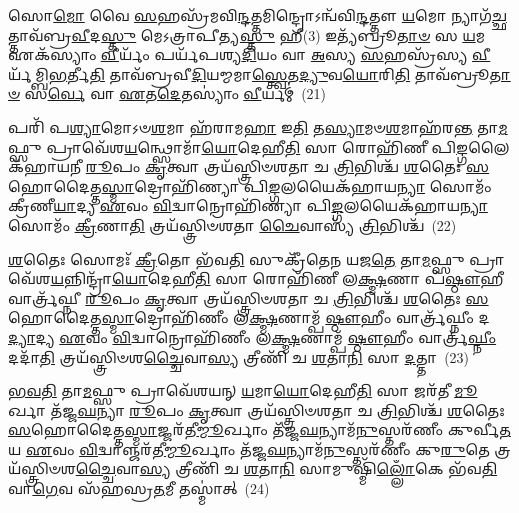 {\anuvakamend[{\-\ul{𑌅}\-\-\ul{𑌬𑍍𑌰}\-\-\ul{𑌵𑍀}\-\-\ul{𑌚𑍍𑌚} 𑌤\-\ul{𑌦}\-𑌨𑍍𑌤𑌰𑌿᳴𑌕𑍍𑌷𑌨𑍍𑌦𑌦𑌾𑌤𑍍𑌯𑌚𑍍𑌛𑌾\-\ul{𑌵𑌾}\-𑌕\-\ul{𑌶𑍍𑌚} 𑌦𑍇𑌯𑍇𑌤𑌿᳴ \ul{𑌸}\-𑌪𑍍𑌤𑌚᳴𑌤𑍍𑌵𑌾𑌰𑌿𑍞𑌶𑌚𑍍𑌚}]}%

𑌸𑍋\-\ul{𑌮𑍋} 𑌵𑍈 \ul{𑌸}\-𑌹𑌸𑍍𑌰᳴𑌮𑌵𑌿\-\ul{𑌨𑍍𑌦}\-𑌤𑍍𑌤𑌮𑌿𑌨𑍍𑌦𑍍𑌰𑍋\-𑌽𑌨𑍍𑌵᳴𑌵𑌿\-\ul{𑌨𑍍𑌦}\-𑌤𑍍𑌤𑍗 \ul{𑌯}\-𑌮𑍋 𑌨𑍍𑌯𑌾𑌗᳴\-\ul{𑌚𑍍𑌛}\-𑌤𑍍𑌤𑌾𑌵᳴𑌬𑍍𑌰\-\ul{𑌵𑍀}\-𑌦\-\ul{𑌸𑍍𑌤𑍁} 𑌮𑍇\-𑌽𑌤𑍍𑌰𑌾𑌪𑍀𑌤𑍍𑌯\-\ul{𑌸𑍍𑌤𑍁} 𑌹𑍀(3) 𑌇𑌤𑍍𑌯᳴𑌬𑍍𑌰𑍂\-\ul{𑌤𑌾}\-\-\ul{𑍞} 𑌸 \ul{𑌯}\-𑌮 𑌏𑌕᳴𑌸𑍍𑌯𑌾𑌂 \ul{𑌵𑍀}\-𑌰𑍍𑌯𑌂᳴ 𑌪𑌰𑍍𑌯᳴𑌪𑌶𑍍𑌯\-\ul{𑌦𑌿}\-𑌯𑌂 𑌵𑌾 \ul{𑌅}\-𑌸𑍍𑌯 \ul{𑌸}\-𑌹𑌸𑍍𑌰᳴𑌸𑍍𑌯 \ul{𑌵𑍀}\-𑌰𑍍𑌯᳴𑌮𑍍𑌬𑌿\-\ul{𑌭}\-𑌰𑍍𑌤𑍀\-\ul{𑌤𑌿} 𑌤𑌾𑌵᳴𑌬𑍍𑌰𑌵𑍀\-\ul{𑌦𑌿}\-𑌯𑌮𑍍𑌮𑌮𑌾\-\ul{𑌸𑍍𑌤𑍍𑌵𑍇}\-𑌤\-\ul{𑌦𑍍𑌯𑍁}\-𑌵\-\ul{𑌯𑍋}\-𑌰𑌿\-\ul{𑌤𑌿} 𑌤𑌾𑌵᳴𑌬𑍍𑌰𑍂\-\ul{𑌤𑌾}\-\-\ul{𑍞} 𑌸\-\ul{𑌰𑍍𑌵𑍇} 𑌵𑌾 \ul{𑌏}\-𑌤\-\ul{𑌦𑍇}\-𑌤𑌸𑍍𑌯𑌾𑌂॑ \ul{𑌵𑍀}\-𑌰𑍍𑌯𑌮𑍍॑~(21)

𑌪𑌰𑌿᳴ 𑌪\-\ul{𑌶𑍍𑌯𑌾}\-𑌮𑍋\-𑌽𑍞\-\ul{𑌶}\-𑌮𑌾 𑌹᳴𑌰𑌾𑌮\-\ul{𑌹𑌾} 𑌇\-\ul{𑌤𑌿} 𑌤\-\ul{𑌸𑍍𑌯𑌾}\-𑌮𑍞\-\ul{𑌶}\-𑌮𑌾𑌹᳴𑌰\-\ul{𑌨𑍍𑌤} 𑌤𑌾\-\ul{𑌮}\-𑌫𑍍𑌸𑍁 𑌪𑍍𑌰𑌾𑌵𑍇᳴𑌶\-\ul{𑌯}\-𑌨𑍍𑌥𑍍𑌸𑍋𑌮𑌾᳴\-\ul{𑌯𑍋}\-𑌦𑍇𑌹𑍀\-\ul{𑌤𑌿} 𑌸𑌾 𑌰𑍋𑌹𑌿᳴𑌣𑍀 𑌪𑌿\-\ul{𑌙𑍍𑌗}\-𑌲𑍈𑌕᳴𑌹𑌾𑌯𑌨𑍀 \ul{𑌰𑍂}\-𑌪𑌂 \ul{𑌕𑍃}\-𑌤𑍍𑌵𑌾 𑌤𑍍𑌰𑌯᳴𑌸𑍍𑌤𑍍𑌰𑌿𑍞𑌶𑌤𑌾 𑌚 \ul{𑌤𑍍𑌰𑌿}\-𑌭𑌿𑌶𑍍𑌚᳴ \ul{𑌶}\-𑌤𑍈𑌃 \ul{𑌸}\-𑌹𑍋𑌦𑍈𑌤𑍍𑌤\-\ul{𑌸𑍍𑌮𑌾}\-𑌦𑍍𑌰𑍋𑌹𑌿᳴𑌣𑍍𑌯𑌾 𑌪𑌿\-\ul{𑌙𑍍𑌗}\-𑌲𑌯𑍈𑌕᳴𑌹𑌾𑌯\-\ul{𑌨𑍍𑌯𑌾} 𑌸𑍋𑌮𑌂᳴ 𑌕𑍍𑌰𑍀𑌣𑍀\-\ul{𑌯𑌾}\-𑌦𑍍𑌯 \ul{𑌏}\-𑌵𑌂 \ul{𑌵𑌿}\-𑌦𑍍𑌵𑌾𑌨𑍍𑌰𑍋𑌹𑌿᳴𑌣𑍍𑌯𑌾 𑌪𑌿\-\ul{𑌙𑍍𑌗}\-𑌲𑌯𑍈𑌕᳴𑌹𑌾𑌯\-\ul{𑌨𑍍𑌯𑌾} 𑌸𑍋𑌮𑌂᳴ \ul{𑌕𑍍𑌰𑍀}\-𑌣𑌾\-\ul{𑌤𑌿} 𑌤𑍍𑌰𑌯᳴𑌸𑍍𑌤𑍍𑌰𑌿𑍞𑌶𑌤𑌾 \ul{𑌚𑍈}\-𑌵𑌾𑌸𑍍𑌯᳴ \ul{𑌤𑍍𑌰𑌿}\-𑌭𑌿𑌶𑍍𑌚᳴~(22)

\-\ul{𑌶}\-𑌤𑍈𑌃 𑌸𑍋𑌮𑌃᳴ \ul{𑌕𑍍𑌰𑍀}\-𑌤𑍋 𑌭᳴𑌵\-\ul{𑌤𑌿} 𑌸𑍁𑌕𑍍𑌰𑍀᳴𑌤𑍇𑌨 𑌯𑌜\-\ul{𑌤𑍇} 𑌤𑌾\-\ul{𑌮}\-𑌫𑍍𑌸𑍁 𑌪𑍍𑌰𑌾𑌵𑍇᳴𑌶\-\ul{𑌯}\-𑌨𑍍𑌨𑌿𑌨𑍍𑌦𑍍𑌰𑌾᳴\-\ul{𑌯𑍋}\-𑌦𑍇𑌹𑍀\-\ul{𑌤𑌿} 𑌸𑌾 𑌰𑍋𑌹𑌿᳴𑌣𑍀 𑌲\-\ul{𑌕𑍍𑌷𑍍𑌮}\-𑌣𑌾 𑌪᳴\-\ul{𑌷𑍍𑌠𑍗}\-𑌹𑍀 𑌵𑌾𑌰𑍍𑌤𑍍𑌰᳴𑌘𑍍𑌨𑍀 \ul{𑌰𑍂}\-𑌪𑌂 \ul{𑌕𑍃}\-𑌤𑍍𑌵𑌾 𑌤𑍍𑌰𑌯᳴𑌸𑍍𑌤𑍍𑌰𑌿𑍞𑌶𑌤𑌾 𑌚 \ul{𑌤𑍍𑌰𑌿}\-𑌭𑌿𑌶𑍍𑌚᳴ \ul{𑌶}\-𑌤𑍈𑌃 \ul{𑌸}\-𑌹𑍋𑌦𑍈𑌤𑍍𑌤\-\ul{𑌸𑍍𑌮𑌾}\-𑌦𑍍𑌰𑍋𑌹𑌿᳴𑌣𑍀𑌂 𑌲\-\ul{𑌕𑍍𑌷𑍍𑌮}\-𑌣𑌾𑌮𑍍𑌪᳴\-\ul{𑌷𑍍𑌠𑍗}\-𑌹𑍀𑌂 𑌵𑌾𑌰𑍍𑌤𑍍𑌰᳴𑌘𑍍𑌨𑍀𑌂 𑌦\-\ul{𑌦𑍍𑌯𑌾}\-𑌦𑍍𑌯 \ul{𑌏}\-𑌵𑌂 \ul{𑌵𑌿}\-𑌦𑍍𑌵𑌾𑌨𑍍𑌰𑍋𑌹𑌿᳴𑌣𑍀𑌂 𑌲\-\ul{𑌕𑍍𑌷𑍍𑌮}\-𑌣𑌾𑌮𑍍𑌪᳴\-\ul{𑌷𑍍𑌠𑍗}\-𑌹𑍀𑌂 𑌵𑌾𑌰𑍍𑌤𑍍𑌰᳴\-\ul{𑌘𑍍𑌨𑍀𑌂} 𑌦𑌦𑌾᳴\-\ul{𑌤𑌿} 𑌤𑍍𑌰𑌯᳴𑌸𑍍𑌤𑍍𑌰𑌿𑍞𑌶\-\ul{𑌚𑍍𑌚𑍈}\-𑌵𑌾\-\ul{𑌸𑍍𑌯} 𑌤𑍍𑌰𑍀𑌣𑌿᳴ 𑌚 \ul{𑌶}\-𑌤𑌾\-\ul{𑌨𑌿} 𑌸𑌾 \ul{𑌦}\-𑌤𑍍𑌤𑌾~(23)

\-\ul{𑌭}\-\-\ul{𑌵}\-\-\ul{𑌤𑌿} 𑌤𑌾\-\ul{𑌮}\-𑌫𑍍𑌸𑍁 𑌪𑍍𑌰𑌾𑌵𑍇᳴𑌶𑌯𑌨𑍍 \ul{𑌯}\-𑌮𑌾\-\ul{𑌯𑍋}\-𑌦𑍇𑌹𑍀\-\ul{𑌤𑌿} 𑌸𑌾 𑌜𑌰᳴𑌤𑍀 \ul{𑌮𑍂}\-𑌰𑍍𑌖𑌾 𑌤᳴𑌜𑍍𑌜\-\ul{𑌘}\-𑌨𑍍𑌯𑌾 \ul{𑌰𑍂}\-𑌪𑌂 \ul{𑌕𑍃}\-𑌤𑍍𑌵𑌾 𑌤𑍍𑌰𑌯᳴𑌸𑍍𑌤𑍍𑌰𑌿𑍞𑌶𑌤𑌾 𑌚 \ul{𑌤𑍍𑌰𑌿}\-𑌭𑌿𑌶𑍍𑌚᳴ \ul{𑌶}\-𑌤𑍈𑌃 \ul{𑌸}\-𑌹𑍋𑌦𑍈𑌤𑍍𑌤\-\ul{𑌸𑍍𑌮𑌾}\-𑌜𑍍𑌜𑌰᳴𑌤𑍀\-\ul{𑌮𑍍𑌮𑍂}\-𑌰𑍍𑌖𑌾𑌂 𑌤᳴𑌜𑍍𑌜\-\ul{𑌘}\-𑌨𑍍𑌯𑌾𑌮᳴\-\ul{𑌨𑍁}\-𑌸𑍍𑌤𑌰᳴𑌣𑍀𑌂 𑌕𑍁𑌰𑍍𑌵𑍀\-\ul{𑌤} 𑌯 \ul{𑌏}\-𑌵𑌂 \ul{𑌵𑌿}\-𑌦𑍍𑌵𑌾𑌞𑍍𑌜𑌰᳴𑌤𑍀\-\ul{𑌮𑍍𑌮𑍂}\-𑌰𑍍𑌖𑌾𑌂 𑌤᳴𑌜𑍍𑌜\-\ul{𑌘}\-𑌨𑍍𑌯𑌾𑌮᳴\-\ul{𑌨𑍁}\-𑌸𑍍𑌤𑌰᳴𑌣𑍀𑌂 𑌕𑍁\-\ul{𑌰𑍁}\-𑌤𑍇 𑌤𑍍𑌰𑌯᳴𑌸𑍍𑌤𑍍𑌰𑌿𑍞𑌶\-\ul{𑌚𑍍𑌚𑍈}\-𑌵𑌾\-\ul{𑌸𑍍𑌯} 𑌤𑍍𑌰𑍀𑌣𑌿᳴ 𑌚 \ul{𑌶}\-𑌤𑌾\-\ul{𑌨𑌿} 𑌸𑌾𑌮𑍁𑌷𑍍𑌮𑌿᳴\-\ul{𑌲𑍍𑌲𑍋𑌁}\-𑌕𑍇 𑌭᳴𑌵\-\ul{𑌤𑌿} 𑌵𑌾\-\ul{𑌗𑍇}\-𑌵 𑌸᳴𑌹𑌸𑍍𑌰\-\ul{𑌤}\-𑌮𑍀 𑌤𑌸𑍍𑌮𑌾॑𑌤𑍍~(24)

